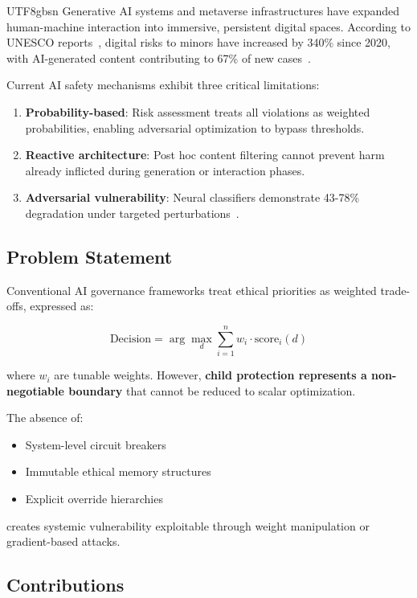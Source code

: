 \documentclass[conference]{IEEEtran}
\begin{document}
\begin{CJK}{UTF8}{gbsn}
Generative AI systems and metaverse infrastructures have expanded human-machine interaction into immersive, persistent digital spaces. According to UNESCO reports~\cite{unesco2023}, digital risks to minors have increased by 340\% since 2020, with AI-generated content contributing to 67\% of new cases~\cite{interpol2024}.

Current AI safety mechanisms exhibit three critical limitations:

\begin{enumerate}
    \item \textbf{Probability-based}: Risk assessment treats all violations as weighted probabilities, enabling adversarial optimization to bypass thresholds.
    
    \item \textbf{Reactive architecture}: Post hoc content filtering cannot prevent harm already inflicted during generation or interaction phases.
    
    \item \textbf{Adversarial vulnerability}: Neural classifiers demonstrate 43-78\% degradation under targeted perturbations~\cite{carlini2023}.
\end{enumerate}

\subsection{Problem Statement}

Conventional AI governance frameworks treat ethical priorities as weighted trade-offs, expressed as:

\begin{equation}
\text{Decision} = \arg\max_{d} \sum_{i=1}^{n} w_i \cdot \text{score}_i(d)
\end{equation}

where $w_i$ are tunable weights. However, \textbf{child protection represents a non-negotiable boundary} that cannot be reduced to scalar optimization.

The absence of:
\begin{itemize}
    \item System-level circuit breakers
    \item Immutable ethical memory structures  
    \item Explicit override hierarchies
\end{itemize}
creates systemic vulnerability exploitable through weight manipulation or gradient-based attacks.

\subsection{Contributions}


\end{CJK}
\end{document}
